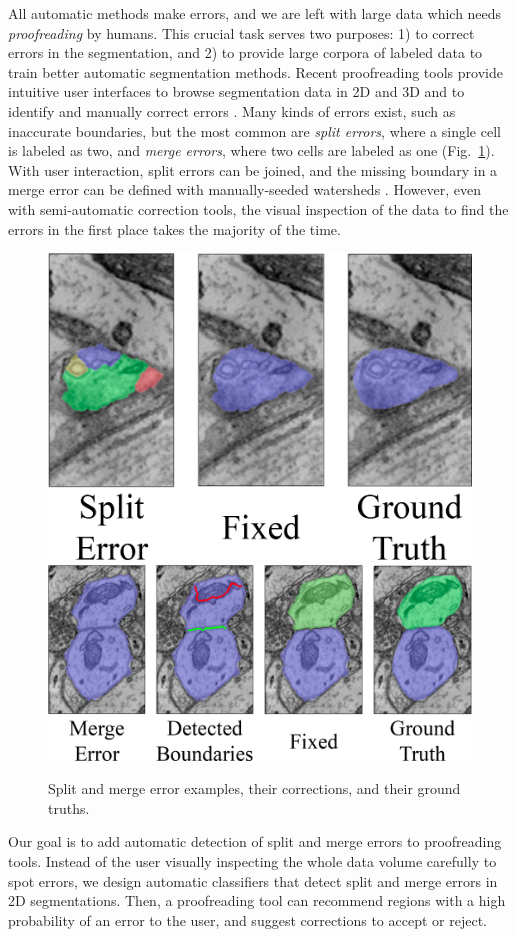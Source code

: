 All automatic methods make errors, and we are left with large data which needs \emph{proofreading} by humans. This crucial task serves two purposes: 1) to correct errors in the segmentation, and 2) to provide large corpora of labeled data to train better automatic segmentation methods. Recent proofreading tools provide intuitive user interfaces to browse segmentation data in 2D and 3D and to identify and manually correct errors \cite{markus_proofreading,raveler,mojo2,haehn_dojo_2014,karimov_guided_volume_editing,uzunbas}. Many kinds of errors exist, such as inaccurate boundaries, but the most common are \emph{split errors}, where a single cell is labeled as two, and \emph{merge errors}, where two cells are labeled as one (Fig.~\ref{fig:merge_error}). With user interaction, split errors can be joined, and the missing boundary in a merge error can be defined with manually-seeded watersheds \cite{haehn_dojo_2014}. However, even with semi-automatic correction tools, the visual inspection of the data to find the errors in the first place takes the majority of the time.

\begin{figure}[t]
\centering
\includegraphics[width=.285\textwidth]{gfx/spliterror_2.png}
\qquad
\includegraphics[width=.45\textwidth]{gfx/mergeerror.png}
\caption{Split and merge error examples, their corrections, and their ground truths.}
\label{fig:merge_error}
\end{figure}

Our goal is to add automatic detection of split and merge errors to proofreading tools. Instead of the user visually inspecting the whole data volume carefully to spot errors, we design automatic classifiers that detect split and merge errors in 2D segmentations. Then, a proofreading tool can recommend regions with a high probability of an error to the user, and suggest corrections to accept or reject.

